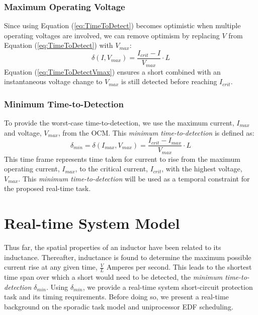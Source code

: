 \documentclass[11pt,oneside]{report}
\begin{document}
    \subsection*{Maximum Operating Voltage}
    Since using Equation (\ref{eq:TimeToDetect}) becomes optimistic when multiple operating voltages are involved, we can remove optimism by replacing $V$ from Equation (\ref{eq:TimeToDetect}) with $V_{max}$:
    \begin{equation}\label{eq:TimeToDetectVmax}
    \delta(I,V_{max}) = \frac{I_{crit}-I}{V_{max}}\cdot L
    \end{equation}
    Equation (\ref{eq:TimeToDetectVmax}) ensures a short combined with an instantaneous voltage change to $V_{max}$ is still detected before reaching $I_{crit}$.
    
    \subsection*{Minimum Time-to-Detection}
    To provide the worst-case time-to-detection, we use the maximum current, $I_{max}$ and voltage, $V_{max}$, from the OCM. This \textit{minimum time-to-detection} is defined as:
    \begin{equation}\label{eq:MinTimeToDetect}
    \delta_{min} = \delta(I_{max},V_{max}) = \frac{I_{crit}-I_{max}}{V_{max}}\cdot L
    \end{equation}
    This time frame represents time taken for current to rise from the maximum operating current, $I_{max}$, to the critical current, $I_{crit}$, with the highest voltage, $V_{max}$. This \textit{minimum time-to-detection} will be used as a temporal constraint for the proposed real-time task.
    \chapter{Real-time System Model}\label{chap:real-time system model}
    Thus far, the spatial properties of an inductor have been related to its inductance. Thereafter, inductance is found to determine the maximum possible current rise at any given time, $\frac{V}{L}$ Amperes per second. This leads to the shortest time span over which a short would need to be detected, the \textit{minimum time-to-detection} $\delta_{min}$. Using $\delta_{min}$, we provide a real-time system short-circuit protection task and its timing requirements. Before doing so, we present a real-time background on the sporadic task model and uniprocessor EDF scheduling.
    
\end{document}
